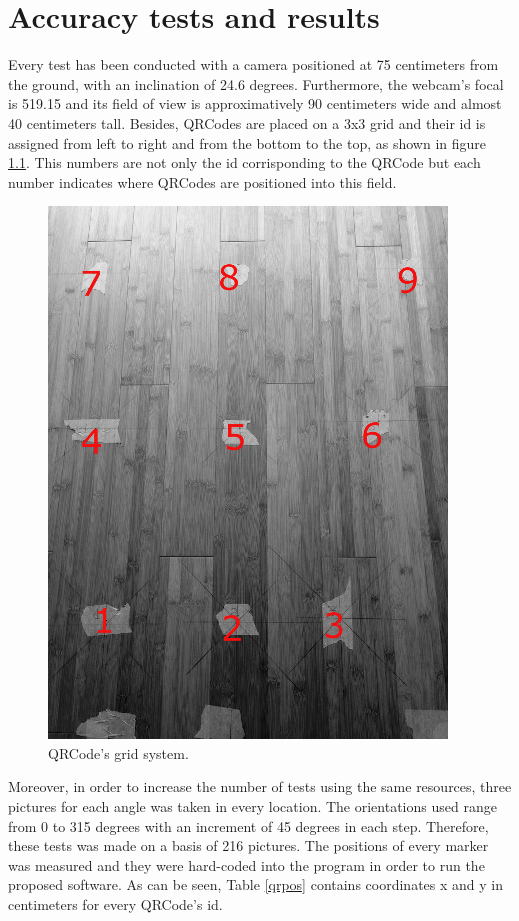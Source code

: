 \chapter{Accuracy tests and results}

Every test has been conducted with a camera positioned at 75 centimeters from the ground, with an inclination of 24.6 degrees. Furthermore, the webcam's focal is 519.15 and its field of view is approximatively 90 centimeters wide and almost 40 centimeters tall. Besides, QRCodes are placed on a 3x3 grid and their id is assigned from left to right and from the bottom to the top, as shown in figure \ref{field}. This numbers are not only the id corrisponding to the QRCode but each number indicates where QRCodes are positioned into this field.

\begin{figure}[hbt]
    \centering
    \includegraphics[scale=0.4]{img/field.png}
    \caption{QRCode's grid system. \label{field}}
\end{figure}
\newpage

Moreover, in order to increase the number of tests using the same resources, three pictures for each angle was taken in every location. The orientations used range from 0 to 315 degrees with an increment of 45 degrees in each step. Therefore, these tests was made on a basis of 216 pictures.
\newline
The positions of every marker was measured and they were hard-coded into the program in order to run the proposed software. As can be seen, Table \ref{qrpos} contains coordinates x and y in centimeters for every QRCode's id.



